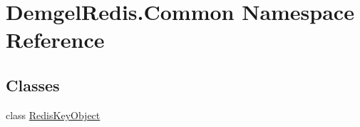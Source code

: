 \hypertarget{namespace_demgel_redis_1_1_common}{}\section{Demgel\+Redis.\+Common Namespace Reference}
\label{namespace_demgel_redis_1_1_common}
\subsection*{Classes}
\begin{DoxyCompactItemize}
\item 
class \hyperlink{class_demgel_redis_1_1_common_1_1_redis_key_object}{Redis\+Key\+Object}
\end{DoxyCompactItemize}
